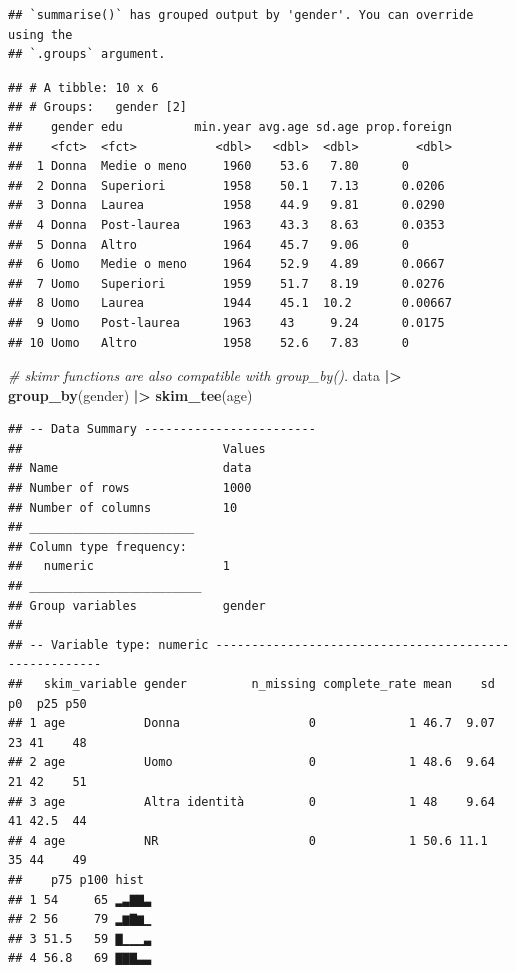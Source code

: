 \documentclass[
]{book}
\newenvironment{Shaded}{\begin{snugshade}}{\end{snugshade}}
\newcommand{\CommentTok}[1]{\textcolor[rgb]{0.56,0.35,0.01}{\textit{#1}}}
\newcommand{\FunctionTok}[1]{\textcolor[rgb]{0.13,0.29,0.53}{\textbf{#1}}}
\newcommand{\NormalTok}[1]{#1}
\newcommand{\SpecialCharTok}[1]{\textcolor[rgb]{0.81,0.36,0.00}{\textbf{#1}}}
\begin{document}
\begin{verbatim}
## `summarise()` has grouped output by 'gender'. You can override using the
## `.groups` argument.
\end{verbatim}

\begin{verbatim}
## # A tibble: 10 x 6
## # Groups:   gender [2]
##    gender edu          min.year avg.age sd.age prop.foreign
##    <fct>  <fct>           <dbl>   <dbl>  <dbl>        <dbl>
##  1 Donna  Medie o meno     1960    53.6   7.80      0      
##  2 Donna  Superiori        1958    50.1   7.13      0.0206 
##  3 Donna  Laurea           1958    44.9   9.81      0.0290 
##  4 Donna  Post-laurea      1963    43.3   8.63      0.0353 
##  5 Donna  Altro            1964    45.7   9.06      0      
##  6 Uomo   Medie o meno     1964    52.9   4.89      0.0667 
##  7 Uomo   Superiori        1959    51.7   8.19      0.0276 
##  8 Uomo   Laurea           1944    45.1  10.2       0.00667
##  9 Uomo   Post-laurea      1963    43     9.24      0.0175 
## 10 Uomo   Altro            1958    52.6   7.83      0
\end{verbatim}

\begin{Shaded}
\begin{Highlighting}[]
\CommentTok{\# skimr functions are also compatible with group\_by().}
\NormalTok{data }\SpecialCharTok{|\textgreater{}} 
  \FunctionTok{group\_by}\NormalTok{(gender) }\SpecialCharTok{|\textgreater{}} 
  \FunctionTok{skim\_tee}\NormalTok{(age)}
\end{Highlighting}
\end{Shaded}

\begin{verbatim}
## -- Data Summary ------------------------
##                            Values
## Name                       data  
## Number of rows             1000  
## Number of columns          10    
## _______________________          
## Column type frequency:           
##   numeric                  1     
## ________________________         
## Group variables            gender
## 
## -- Variable type: numeric ------------------------------------------------------
##   skim_variable gender         n_missing complete_rate mean    sd p0  p25 p50
## 1 age           Donna                  0             1 46.7  9.07 23 41    48
## 2 age           Uomo                   0             1 48.6  9.64 21 42    51
## 3 age           Altra identità         0             1 48    9.64 41 42.5  44
## 4 age           NR                     0             1 50.6 11.1  35 44    49
##    p75 p100 hist 
## 1 54     65 ▂▃▇▇▃
## 2 56     79 ▂▆▇▆▁
## 3 51.5   59 ▇▁▁▁▃
## 4 56.8   69 ▇▇▇▃▃
\end{verbatim}
\end{document}

